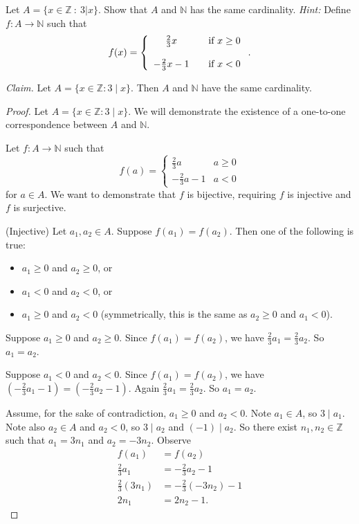 \documentclass{article}
\newcommand{\Z}{\mathbb{Z}}
\newcommand{\N}{\mathbb{N}}
\theoremstyle{definition}
\begin{document}
\begin{question}
    Let $A = \{ x \in \Z ~:~ 3|x \}$.  Show that $A$ and $\mathbb{N}$ has the same cardinality.  {\it Hint:} Define $f: A \rightarrow \N$ such that
\[ f(x) =\left\{\begin{array}{c c l} \frac{2}{3}x & & \text{if } x \geq 0 \\ ~ \\ -\frac{2}{3}x - 1 &  & \text{if } x < 0 \end{array} \right. .\]
\end{question}
\begin{solution}\newline

\noindent\textit{Claim. }Let $A=\{x\in\Z:3\mid x\}$. Then $A$ and $\N$ have the same cardinality.
\begin{proof}
Let $A=\{x\in\Z:3\mid x\}$. We will demonstrate the existence of a one-to-one correspondence between $A$ and $\N$.\newline

\noindent Let $f:A\to\N$ such that
\[f(a) = \begin{cases} 
\frac{2}{3}a&a\geq 0\\
-\frac{2}{3}a-1&a<0
\end{cases}
\]
for $a\in A$. We want to demonstrate that $f$ is bijective, requiring $f$ is injective and $f$ is surjective.\newline

\noindent(Injective) Let $a_1,a_2\in A$. Suppose $f(a_1)=f(a_2)$. Then one of the following is true:
\begin{itemize}
    \item $a_1\geq 0$ and $a_2\geq 0$, or
    \item $a_1<0$ and $a_2<0$, or
    \item $a_1\geq 0$ and $a_2<0$ (symmetrically, this is the same as $a_2\geq 0$ and $a_1<0$).
\end{itemize}

Suppose $a_1\geq 0$ and $a_2\geq 0$. Since $f(a_1)=f(a_2)$, we have $\frac{2}{3}a_1=\frac{2}{3}a_2$. So $a_1=a_2$.\newline

Suppose $a_1<0$ and $a_2<0$. Since $f(a_1)=f(a_2)$, we have $\left(-\frac{2}{3}a_1-1\right)=\left(-\frac{2}{3}a_2-1\right)$. Again $\frac{2}{3}a_1=\frac{2}{3}a_2$. So $a_1=a_2$.\newline

Assume, for the sake of contradiction, $a_1\geq 0$ and $a_2<0$. Note $a_1\in A$, so $3\mid a_1$. Note also $a_2\in A$ and $a_2<0$, so $3\mid a_2$ and $(-1)\mid a_2$. So there exist $n_1,n_2\in\Z$ such that $a_1=3n_1$ and $a_2=-3n_2$. Observe
\begin{align*}
f(a_1)&=f(a_2)\\
\frac{2}{3}a_1&=-\frac{2}{3}a_2-1\\
\frac{2}{3}(3n_1)&=-\frac{2}{3}(-3n_2)-1\\
2n_1&=2n_2-1.
\end{align*}


\end{proof}
\end{solution}
\end{document}
